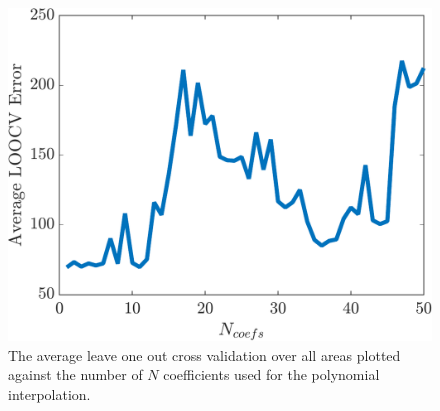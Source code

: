 \begin{figure}[!htb]
\centering
\includegraphics[width=.75\textwidth]{./gfx/chapters/data/Average-LOOCV-Error.pdf}
\caption{The average leave one out cross validation over all areas plotted against the number of $N$ coefficients used for the polynomial interpolation.}
\label{fig:dataset:cumulatief-recordings}
\end{figure}


